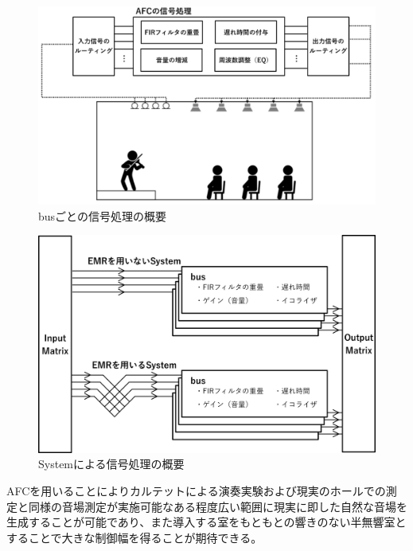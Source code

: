 \documentclass[11pt,a4j]{jreport}
\begin{document}
\newpage

\begin{figure}[H]
  \centering
  \includegraphics[width=0.8\linewidth]{images/AFCbusProcessing.png}
  \caption{busごとの信号処理の概要}
  \label{fig:busごとの信号処理の概要}
\end{figure}


\begin{figure}[H]
  \centering
  \includegraphics[width=0.8\linewidth]{images/AFCsystemProcessing.png}
  \caption{Systemによる信号処理の概要}
  \label{fig:Systemによる信号処理の概要}
\end{figure}


\newpage
AFCを用いることによりカルテットによる演奏実験および現実のホールでの測定と同様の音場測定が実施可能なある程度広い範囲に現実に即した自然な音場を生成することが可能であり、また導入する室をもともとの響きのない半無響室とすることで大きな制御幅を得ることが期待できる。
\end{document}
